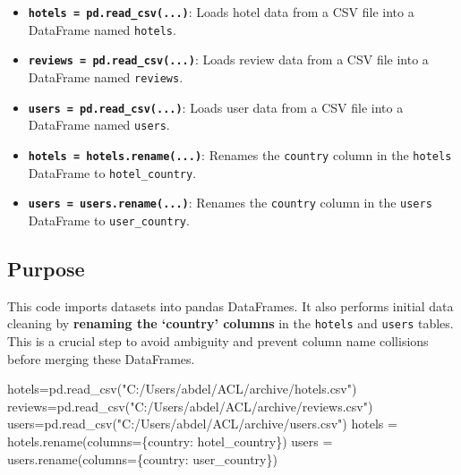 \documentclass[
  letterpaper,
  DIV=11,
  numbers=noendperiod]{scrartcl}
\newenvironment{Shaded}{\begin{snugshade}}{\end{snugshade}}
\newcommand{\NormalTok}[1]{\textcolor[rgb]{0.00,0.23,0.31}{#1}}
\newcommand{\OperatorTok}[1]{\textcolor[rgb]{0.37,0.37,0.37}{#1}}
\newcommand{\StringTok}[1]{\textcolor[rgb]{0.13,0.47,0.30}{#1}}
\providecommand{\tightlist}{%
  \setlength{\itemsep}{0pt}\setlength{\parskip}{0pt}}
\begin{document}
\begin{itemize}
\tightlist
\item
  \textbf{\texttt{hotels\ =\ pd.read\_csv(...)}}: Loads hotel data from
  a CSV file into a DataFrame named \texttt{hotels}.
\item
  \textbf{\texttt{reviews\ =\ pd.read\_csv(...)}}: Loads review data
  from a CSV file into a DataFrame named \texttt{reviews}.
\item
  \textbf{\texttt{users\ =\ pd.read\_csv(...)}}: Loads user data from a
  CSV file into a DataFrame named \texttt{users}.
\item
  \textbf{\texttt{hotels\ =\ hotels.rename(...)}}: Renames the
  \texttt{country} column in the \texttt{hotels} DataFrame to
  \texttt{hotel\_country}.
\item
  \textbf{\texttt{users\ =\ users.rename(...)}}: Renames the
  \texttt{country} column in the \texttt{users} DataFrame to
  \texttt{user\_country}.
\end{itemize}

\subsection{Purpose}\label{purpose-1}

This code imports datasets into pandas DataFrames. It also performs
initial data cleaning by \textbf{renaming the `country' columns} in the
\texttt{hotels} and \texttt{users} tables. This is a crucial step to
avoid ambiguity and prevent column name collisions before merging these
DataFrames.

\begin{Shaded}
\begin{Highlighting}[]
\NormalTok{hotels}\OperatorTok{=}\NormalTok{pd.read\_csv(}\StringTok{"C:/Users/abdel/ACL/archive/hotels.csv"}\NormalTok{)}
\NormalTok{reviews}\OperatorTok{=}\NormalTok{pd.read\_csv(}\StringTok{"C:/Users/abdel/ACL/archive/reviews.csv"}\NormalTok{)}
\NormalTok{users}\OperatorTok{=}\NormalTok{pd.read\_csv(}\StringTok{"C:/Users/abdel/ACL/archive/users.csv"}\NormalTok{)}
\NormalTok{hotels }\OperatorTok{=}\NormalTok{ hotels.rename(columns}\OperatorTok{=}\NormalTok{\{}\StringTok{\textquotesingle{}country\textquotesingle{}}\NormalTok{: }\StringTok{\textquotesingle{}hotel\_country\textquotesingle{}}\NormalTok{\})}
\NormalTok{users }\OperatorTok{=}\NormalTok{ users.rename(columns}\OperatorTok{=}\NormalTok{\{}\StringTok{\textquotesingle{}country\textquotesingle{}}\NormalTok{: }\StringTok{\textquotesingle{}user\_country\textquotesingle{}}\NormalTok{\})}
\end{Highlighting}
\end{Shaded}
\end{document}
